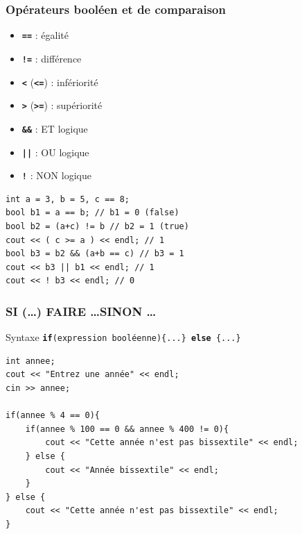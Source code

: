 \begin{frame}[fragile]
	\frametitle{Opérateurs booléen et de comparaison}
	\begin{minipage}{0.43\linewidth}
		\begin{itemize}
			\item \texttt{\textbf{==}} : égalité
			\item \texttt{\textbf{!=}} : différence
			\item \texttt{\textbf{<}} (\texttt{\textbf{<=}}) : infériorité
			\item \texttt{\textbf{>}} (\texttt{\textbf{>=}}) : supériorité
			\item \texttt{\textbf{\&\&}} : ET logique
			\item \texttt{\textbf{||}} : OU logique
			\item \texttt{\textbf{!}} : NON logique
		\end{itemize}
	\end{minipage}
	\hfill
	\begin{minipage}{0.53\linewidth}
		\begin{verbatim}
int a = 3, b = 5, c == 8;
bool b1 = a == b; // b1 = 0 (false)
bool b2 = (a+c) != b // b2 = 1 (true)
cout << ( c >= a ) << endl; // 1
bool b3 = b2 && (a+b == c) // b3 = 1
cout << b3 || b1 << endl; // 1
cout << ! b3 << endl; // 0
		\end{verbatim}
	\end{minipage}

\end{frame}

\begin{frame}[fragile]
	\frametitle{SI (\dots) FAIRE \dots SINON \dots}
	\begin{block}{Syntaxe}
		\centering
		\texttt{\textbf{if}(expression booléenne)\{...\} \textbf{else} \{...\}}
	\end{block}
	\begin{verbatim}
int annee;
cout << "Entrez une année" << endl;
cin >> annee;

if(annee % 4 == 0){
    if(annee % 100 == 0 && annee % 400 != 0){
        cout << "Cette année n'est pas bissextile" << endl;
    } else {
        cout << "Année bissextile" << endl;
    }
} else {
    cout << "Cette année n'est pas bissextile" << endl;
}
	\end{verbatim}
\end{frame}

